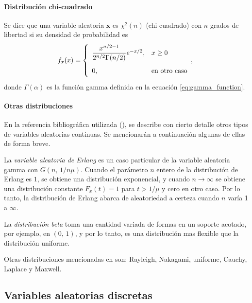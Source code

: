 \documentclass[a4paper]{report}
\newcommand{\x}{\mathbf{x}}
\begin{document}
\paragraph{Distribución chi-cuadrado}

Se dice que una variable aleatoria \(\x\) es \(\chi^2(n)\) (chi-cuadrado) con \(n\) grados de libertad si su densidad de probabilidad es
\begin{equation}\label{eq:pdf_chi_square}
\def\arraystretch{2.0}
 f_x(x)=
 \left\{\begin{array}{ll}
  \dfrac{x^{n/2-1}}{2^{n/2}\Gamma(n/2)} e^{-x/2}, & x\geq 0\\
  0, & \textrm{en otro caso}
 \end{array}, \right.
\end{equation}
donde \(\Gamma(\alpha)\) es la función gamma definida en la ecuación \ref{eq:gamma_function}.


\paragraph{Otras distribuciones}

En la referencia bibliográfica utilizada (\cite{papoulis2002probability}), se describe con cierto detalle otros tipos de variables aleatorias continuas. Se mencionarán a continuación algunas de ellas de forma breve. 

La \emph{variable aleatoria de Erlang} es un caso particular de la variable aleatoria gamma con \(G(n,\, 1/n\mu)\). Cuando el parámetro \(n\) entero de la distribución de Erlang es \(1\), se obtiene una distribución exponencial, y cuando \(n\to\infty\) se obtiene una distribución constante \(F_x(t)=1\) para \(t>1/\mu\) y cero en otro caso. Por lo tanto, la distribución de Erlang abarca  de aleatoriedad a certeza cuando \(n\) varía 1 a \(\infty\).

La \emph{distribución beta} toma una cantidad variada de formas en un soporte acotado, por ejemplo, en \((0,\, 1)\), y por lo tanto, es una distribución mas flexible que la distribución uniforme.

Otras distribuciones mencionadas en \cite{papoulis2002probability} son: Rayleigh, Nakagami, uniforme, Cauchy, Laplace y Maxwell.

\subsection{Variables aleatorias discretas}\label{sec:discrete_random_variables}
\end{document}
